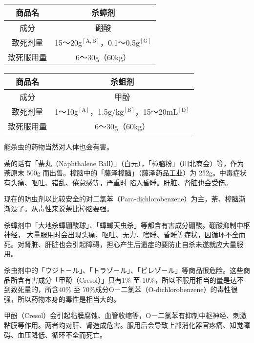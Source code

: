 \documentclass[UTF8]{ctexart}
\begin{document}
\begin{table}[htbp]
\begin{center}
\begin{tabular}{cc}

\toprule
商品名 & 杀蟑剂 \\
\midrule
成分 & 硼酸 \\
致死剂量 & 15～20g$^\mathrm{[A,B]}$，0.1～0.5g$^\mathrm{[G]}$ \\
致死服用量 & 6～30g（60kg）  \\
\bottomrule
\end{tabular}
\end{center}
\end{table}


\begin{table}[htbp]
\begin{center}
\begin{tabular}{cc}

\toprule
商品名 & 杀蛆剂 \\
\midrule
成分 & 甲酚 \\
致死剂量 & 1～10g$^\mathrm{[A]}$，1.5g/kg$^\mathrm{[B]}$，15～20mL$^\mathrm{[D]}$ \\
致死服用量 & 6～30g（60kg）  \\
\bottomrule
\end{tabular}
\end{center}
\end{table}

能杀虫的药物当然对人体也会有害。

荼的话有「荼丸（Naphthalene Ball）」（白元），「樟脑粉」（川北商会）等，作为荼原末 500g 而出售。樟脑中的「藤泽樟脑」（藤泽药品工业）为 252g。中毒症状有头痛、呕吐、错乱、倦怠感等，严重时 陷入昏睡。肝脏、肾脏也会受伤。

现在的防虫剂以比较安全的对二氯苯（Para-dichlorobenzene）为主，荼、樟脑渐渐没了。从毒性来说荼比樟脑要强。

杀蟑剂中「大地杀蟑硼酸球」、「蟑螂天虫杀」等都含有害成分硼酸。硼酸抑制中枢神经，
大量服用时会出现头痛、呕吐、无力、嗜睡、昏睡等症状，因循环不全而死。对肾脏、肝脏也会引起障碍，担心产生后遗症的要防止自杀未遂就应大量服用。

杀虫剂中的「ウジト－ル」、「トラゾ－ル」、「ピレゾ－ル」等商品很危险。这些商品所含有害成分「甲酚（Cresol）」只有$1\%$ 至 $10\%$，所以不服用相当的量是达不到致死量的，所含$40\%$ 至 $70\%$成分O－二氯苯（O-dichlorobenzene）的毒性很强，所以药物本身的毒性是相当大的。

甲酚（Cresol）会引起粘膜腐蚀、血管收缩等，O－二氯苯有抑制中枢神经、刺激粘膜等作用。两者均对肝、肾造成危害。服用后会导致上部消化器官疼痛、知觉障碍、血压降低、循环不全而死亡。
\end{document}
